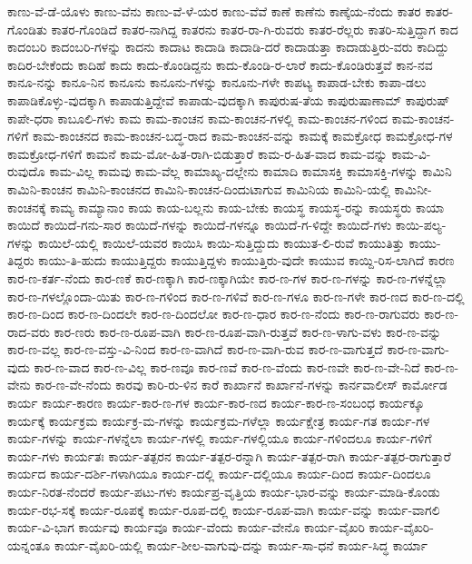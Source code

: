 {ಕಾಣು-ವೆ-ಡೆ-ಯೊಳು
ಕಾಣು-ವೆನು
ಕಾಣು-ವೆ-ಳೆ-ಯರ
ಕಾಣು-ವೆವೆ
ಕಾಣೆ
ಕಾಣೆನು
ಕಾಣ್ಕೆಯ-ನೆಂದು
ಕಾತರ
ಕಾತರ-ಗೊಂಡಿತು
ಕಾತರ-ಗೊಂಡಿದೆ
ಕಾತರ-ನಾಗಿದ್ದ
ಕಾತರನು
ಕಾತರ-ರಾ-ಗಿ-ರುವರು
ಕಾತರ-ರೆಲ್ಲರು
ಕಾತರಿ-ಸುತ್ತಿದ್ದಾಗ
ಕಾದ
ಕಾದಂಬರಿ
ಕಾದಂಬರಿ-ಗಳನ್ನು
ಕಾದನು
ಕಾದಾಟ
ಕಾದಾಡಿ
ಕಾದಾಡಿ-ದರೆ
ಕಾದಾಡುತ್ತಾ
ಕಾದಾಡುತ್ತಿರು-ವರು
ಕಾದಿದ್ದು
ಕಾದಿರ-ಬೇಕೆಂದು
ಕಾದಿಹೆ
ಕಾದು
ಕಾದು-ಕೊಂಡಿದ್ದನು
ಕಾದು-ಕೊಂಡಿ-ರ-ಲಾರೆ
ಕಾದು-ಕೊಂಡಿರುತ್ತವೆ
ಕಾನ-ನವ
ಕಾನೂ-ನನ್ನು
ಕಾನೂ-ನಿನ
ಕಾನೂನು
ಕಾನೂನು-ಗಳನ್ನು
ಕಾನೂನು-ಗಳೇ
ಕಾಪಟ್ಯ
ಕಾಪಾಡ-ಬೇಕು
ಕಾಪಾ-ಡಲು
ಕಾಪಾಡಿಕೊಳ್ಳು-ವುದಕ್ಕಾಗಿ
ಕಾಪಾಡುತ್ತಿದ್ದೇವೆ
ಕಾಪಾಡು-ವುದಕ್ಕಾಗಿ
ಕಾಪುರುಷ-ತೆಯ
ಕಾಪುರುಷಾಣಾಮ್
ಕಾಪುರುಷ್
ಕಾಪೇ-ಧರಾ
ಕಾಬೂಲಿ-ಗಳು
ಕಾಮ
ಕಾಮ-ಕಾಂಚನ
ಕಾಮ-ಕಾಂಚನ-ಗಳಲ್ಲಿ
ಕಾಮ-ಕಾಂಚನ-ಗಳಿಂದ
ಕಾಮ-ಕಾಂಚನ-ಗಳಿಗೆ
ಕಾಮ-ಕಾಂಚನದ
ಕಾಮ-ಕಾಂಚನ-ಬದ್ಧ-ರಾದ
ಕಾಮ-ಕಾಂಚನ-ವನ್ನು
ಕಾಮಕ್ಕೆ
ಕಾಮಕ್ರೋಧ
ಕಾಮಕ್ರೋಧ-ಗಳ
ಕಾಮಕ್ರೋಧ-ಗಳಿಗೆ
ಕಾಮನೆ
ಕಾಮ-ಮೋ-ಹಿತ-ರಾಗಿ-ಬಿಡುತ್ತಾರೆ
ಕಾಮ-ರ-ಹಿತ-ವಾದ
ಕಾಮ-ವನ್ನು
ಕಾಮ-ವಿ-ರುವುದೊ
ಕಾಮ-ವಿಲ್ಲ
ಕಾಮವು
ಕಾಮ-ವೆಲ್ಲ
ಕಾಮಾಖ್ಯ-ದಲ್ಲೇನು
ಕಾಮಾದಿ
ಕಾಮಾಸಕ್ತಿ
ಕಾಮಾಸಕ್ತಿ-ಗಳನ್ನು
ಕಾಮಿನಿ
ಕಾಮಿನಿ-ಕಾಂಚನ
ಕಾಮಿನಿ-ಕಾಂಚನದ
ಕಾಮಿನಿ-ಕಾಂಚನ-ದಿಂದುಟಾಗುವ
ಕಾಮಿನಿಯ
ಕಾಮಿನಿ-ಯಲ್ಲಿ
ಕಾಮಿನೀ-ಕಾಂಚನಕ್ಕೆ
ಕಾಮ್ಯ
ಕಾಮ್ಯಾನಾಂ
ಕಾಯ
ಕಾಯ-ಬಲ್ಲನು
ಕಾಯ-ಬೇಕು
ಕಾಯಸ್ಥ
ಕಾಯಸ್ಥ-ರನ್ನು
ಕಾಯಸ್ಥರು
ಕಾಯಾ
ಕಾಯಿದೆ
ಕಾಯಿದೆ-ಗನು-ಸಾರ
ಕಾಯಿದೆ-ಗಳನ್ನು
ಕಾಯಿದೆ-ಗಳನ್ನೂ
ಕಾಯಿದೆ-ಗ-ಳಿದ್ದೇ
ಕಾಯಿದೆ-ಗಳು
ಕಾಯಿ-ಪಲ್ಯ-ಗಳನ್ನು
ಕಾಯಿಲೆ-ಯಲ್ಲಿ
ಕಾಯಿಲೆ-ಯವರ
ಕಾಯಿಸಿ
ಕಾಯಿ-ಸುತ್ತಿದ್ದುದು
ಕಾಯುತ-ಲಿ-ರುವೆ
ಕಾಯುತಿತ್ತು
ಕಾಯು-ತಿದ್ದರು
ಕಾಯು-ತಿ-ಹುದು
ಕಾಯುತ್ತಿದ್ದರು
ಕಾಯುತ್ತಿದ್ದಳು
ಕಾಯುತ್ತಿರು-ವುದೇ
ಕಾಯುವ
ಕಾಯ್ದಿ-ರಿಸ-ಲಾಗಿದೆ
ಕಾರಣ
ಕಾರ-ಣ-ಕರ್ತ-ನೆಂದು
ಕಾರ-ಣಕೆ
ಕಾರ-ಣಕ್ಕಾಗಿ
ಕಾರ-ಣಕ್ಕಾಗಿಯೇ
ಕಾರ-ಣ-ಗಳ
ಕಾರ-ಣ-ಗಳನ್ನು
ಕಾರ-ಣ-ಗಳನ್ನೆಲ್ಲಾ
ಕಾರ-ಣ-ಗಳಲ್ಲೊಂದಾ-ಯಿತು
ಕಾರ-ಣ-ಗಳಿಂದ
ಕಾರ-ಣ-ಗಳಿವೆ
ಕಾರ-ಣ-ಗಳೂ
ಕಾರ-ಣ-ಗಳೇ
ಕಾರ-ಣದ
ಕಾರ-ಣ-ದಲ್ಲಿ
ಕಾರ-ಣ-ದಿಂದ
ಕಾರ-ಣ-ದಿಂದಲೇ
ಕಾರ-ಣ-ದಿಂದಲೋ
ಕಾರ-ಣ-ಧಾರ
ಕಾರ-ಣ-ನೆಂದು
ಕಾರ-ಣ-ರಾಗುವರು
ಕಾರ-ಣ-ರಾದ-ವರು
ಕಾರ-ಣರು
ಕಾರ-ಣ-ರೂಪ-ವಾಗಿ
ಕಾರ-ಣ-ರೂಪ-ವಾಗಿ-ರುತ್ತವೆ
ಕಾರ-ಣ-ಳಾಗು-ವಳು
ಕಾರ-ಣ-ವನ್ನು
ಕಾರ-ಣ-ವಲ್ಲ
ಕಾರ-ಣ-ವಸ್ತು-ವಿ-ನಿಂದ
ಕಾರ-ಣ-ವಾಗಿದೆ
ಕಾರ-ಣ-ವಾಗಿ-ರುವ
ಕಾರ-ಣ-ವಾಗುತ್ತದೆ
ಕಾರ-ಣ-ವಾಗು-ವುದು
ಕಾರ-ಣ-ವಾದ
ಕಾರ-ಣ-ವಿಲ್ಲ
ಕಾರ-ಣವೂ
ಕಾರ-ಣವೆ
ಕಾರ-ಣ-ವೆಂದು
ಕಾರ-ಣವೇ
ಕಾರ-ಣ-ವೇ-ನಿದೆ
ಕಾರ-ಣ-ವೇನು
ಕಾರ-ಣ-ವೇ-ನೆಂದು
ಕಾರವು
ಕಾರಿ-ರು-ಳಿನ
ಕಾರೆ
ಕಾರ್ಖಾನೆ
ಕಾರ್ಖಾನೆ-ಗಳನ್ನು
ಕಾರ್ನವಾಲೀಸ್
ಕಾರ್ಮೋಡ
ಕಾರ್ಯ
ಕಾರ್ಯ-ಕಾರಣ
ಕಾರ್ಯ-ಕಾರ-ಣ-ಗಳ
ಕಾರ್ಯ-ಕಾರ-ಣದ
ಕಾರ್ಯ-ಕಾರ-ಣ-ಸಂಬಂಧ
ಕಾರ್ಯಕ್ಕೂ
ಕಾರ್ಯಕ್ಕೆ
ಕಾರ್ಯಕ್ರಮ
ಕಾರ್ಯಕ್ರ-ಮ-ಗಳನ್ನು
ಕಾರ್ಯಕ್ರಮ-ಗಳೆಲ್ಲಾ
ಕಾರ್ಯಕ್ಷೇತ್ರ
ಕಾರ್ಯ-ಗತ
ಕಾರ್ಯ-ಗಳ
ಕಾರ್ಯ-ಗಳನ್ನು
ಕಾರ್ಯ-ಗಳನ್ನೆಲಾ
ಕಾರ್ಯ-ಗಳಲ್ಲಿ
ಕಾರ್ಯ-ಗಳಲ್ಲಿಯೂ
ಕಾರ್ಯ-ಗಳಿಂದಲೂ
ಕಾರ್ಯ-ಗಳಿಗೆ
ಕಾರ್ಯ-ಗಳು
ಕಾರ್ಯತಃ
ಕಾರ್ಯ-ತತ್ಪರನ
ಕಾರ್ಯ-ತತ್ಪರ-ರನ್ನಾಗಿ
ಕಾರ್ಯ-ತತ್ಪರ-ರಾಗಿ
ಕಾರ್ಯ-ತತ್ಪರ-ರಾಗುತ್ತಾರೆ
ಕಾರ್ಯದ
ಕಾರ್ಯ-ದರ್ಶಿ-ಗಳಾಗಿಯೂ
ಕಾರ್ಯ-ದಲ್ಲಿ
ಕಾರ್ಯ-ದಲ್ಲಿಯೂ
ಕಾರ್ಯ-ದಿಂದ
ಕಾರ್ಯ-ದಿಂದಲೂ
ಕಾರ್ಯ-ನಿರತ-ನೆಂದರೆ
ಕಾರ್ಯ-ಪಟು-ಗಳು
ಕಾರ್ಯಪ್ರ-ವೃತ್ತಿಯ
ಕಾರ್ಯ-ಭಾರ-ವನ್ನು
ಕಾರ್ಯ-ಮಾಡಿ-ಕೊಂಡು
ಕಾರ್ಯ-ರಭ-ಸಕ್ಕೆ
ಕಾರ್ಯ-ರೂಪಕ್ಕೆ
ಕಾರ್ಯ-ರೂಪ-ದಲ್ಲಿ
ಕಾರ್ಯ-ರೂಪ-ವಾಗಿ
ಕಾರ್ಯ-ವನ್ನು
ಕಾರ್ಯ-ವಾಗಲಿ
ಕಾರ್ಯ-ವಿ-ಭಾಗ
ಕಾರ್ಯವು
ಕಾರ್ಯವೂ
ಕಾರ್ಯ-ವೆಂದು
ಕಾರ್ಯ-ವೇನೊ
ಕಾರ್ಯ-ವೈಖರಿ
ಕಾರ್ಯ-ವೈಖರಿ-ಯನ್ನಂತೂ
ಕಾರ್ಯ-ವೈಖರಿ-ಯಲ್ಲಿ
ಕಾರ್ಯ-ಶೀಲ-ವಾಗುವು-ದನ್ನು
ಕಾರ್ಯ-ಸಾ-ಧನೆ
ಕಾರ್ಯ-ಸಿದ್ಧ
ಕಾರ್ಯಾ
}
